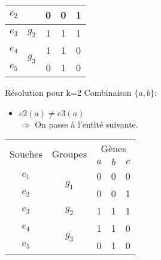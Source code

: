 \begin{overprint}
{\begin{minipage}[l]{0.46\linewidth}
\begin{center}
\begin{tabular}{|c||c|c|c|c|}
						\cline{1-1} \cline{3-5}
						$e_2$&& \cellcolor{cyan}0 & 0 & 1\\
						\hline
						\hline
						$e_3$&$g_2$& \cellcolor{cyan}1 & 1 & 1\\
						\hline
						\hline
						$e_4$&\multirow{2}{*}{$g_3$}& 1 & 1 & 0\\
						\cline{1-1} \cline{3-5}
						$e_5$&& 0 & 1 & 0\\
						\hline
					\end{tabular}
				\end{center}
			\end{minipage}
			\hspace{0.6cm}
			\begin{minipage}[r]{0.46\linewidth}
				\begin{block}{Résolution pour k=2}
					Combinaison $\{a,b\}$:
					\begin{itemize}
						\item $e2(a) \not = e3(a) $ \\ $\Rightarrow$ On passe à l'entité suivante.
					\end{itemize}
				\end{block}
			\end{minipage}
		}
		{
			\begin{minipage}[l]{0.46\linewidth}
				\begin{center}
					\begin{tabular}{|c||c|c|c|c|}
						\hline
						\multirow{2}{*}{Souches}&\multirow{2}{*}{Groupes}&\multicolumn{3}{c|}{Gènes
						}\\
						&&\cellcolor{blue!75}$a$&\cellcolor{blue!75}$b$&$c$\\
						\hline
						\hline
						$e_1$&\multirow{2}{*}{$g_1$}& 0 & 0 & 0\\
						\cline{1-1} \cline{3-5}
						$e_2$&& \cellcolor{cyan}0 & 0 & 1\\
						\hline
						\hline
						$e_3$&$g_2$& 1 & 1 & 1\\
						\hline
						\hline
						$e_4$&\multirow{2}{*}{$g_3$}& \cellcolor{cyan}1 & 1 & 0\\
						\cline{1-1} \cline{3-5}
						$e_5$&& 0 & 1 & 0\\
						\hline
					\end{tabular}
				\end{center}
			\end{minipage}
			\hspace{0.6cm}
			\begin{minipage}[r]{0.46\linewidth}

\end{minipage}}
\end{overprint}
